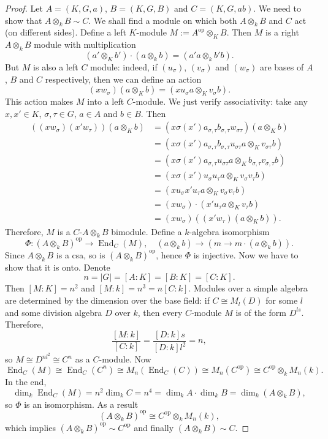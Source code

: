 \documentclass[10pt, a4paper]{article}
\newenvironment{noticeC}{%
  \tcolorbox[%
  notitle,
  empty,
  enhanced,  %
  breakable,
  coltext=black, 
  fontupper=\rmfamily,
  noparskip,
  sharp corners,
  boxrule=-1pt,  %
  frame hidden,
  left=7pt,  %
  right=7pt,
  top=5pt,
  bottom=5pt,
  before skip=2.5ex plus 2pt,
  after skip=2.5ex plus 2pt,
  overlay unbroken and last={%
  },
  ]}
{\endtcolorbox}
\newenvironment{myproof}%
  {\begin{noticeC}\begin{proof}}%
  {\end{proof}\end{noticeC}}
\DeclareMathOperator{\op}{op}
\DeclareMathOperator{\en}{End}
\begin{document}
\begin{myproof}
  Let $A = (K, G, a)$, $B = (K, G, B)$ and $C = (K, G, ab)$.
  We need to show that $A \otimes_k B \sim C$.
  We shall find a module on which both $A \otimes_k B$ and $C$ act (on different sides).
  Define a left $K$-module $M := A^{\op} \otimes_K B$. Then $M$ is a right $A \otimes_k B$ module with multiplication 
  $$(a' \otimes_K b') \cdot (a \otimes_k b) = (a' a \otimes_k b' b).$$
  But $M$ is also a left $C$ module: indeed, if $(u_\sigma)$, $(v_\sigma)$ and $(w_\sigma)$ are bases of $A$, $B$ and $C$ respectively,
  then we can define an action 
  $$(x w_\sigma) (a \otimes_K b) = (x u_{\sigma} a \otimes_K v_\sigma b).$$
  This action makes $M$ into a left $C$-module. We just verify associativity: 
  take any $x, x' \in K$, $\sigma, \tau \in G$, $a \in A$ and $b \in B$.
  Then 
  \begin{align*}
    ((x w_{\sigma}) (x' w_{\tau})) (a \otimes_K b) &= (x \sigma(x') a_{\sigma, \tau} b_{\sigma, \tau} w_{\sigma \tau}) (a \otimes_K b)\\
    &= (x \sigma(x') a_{\sigma, \tau} b_{\sigma, \tau} u_{\sigma \tau} a \otimes_K v_{\sigma \tau} b)\\
    &= (x \sigma(x') a_{\sigma, \tau} u_{\sigma \tau} a \otimes_K b_{\sigma, \tau} v_{\sigma, \tau} b)\\
    &= (x \sigma(x') u_{\sigma} u_{\tau} a \otimes_K v_{\sigma} v_{\tau} b)\\
    &= (x u_{\sigma} x' u_{\tau} a \otimes_K v_{\sigma} v_{\tau} b)\\
    &= (x w_{\sigma}) \cdot (x' u_{\tau} a \otimes_K v_{\tau} b)\\
    &= (x w_{\sigma}) ((x' w_{\tau}) (a \otimes_K b)).
  \end{align*}
  Therefore, $M$ is a $C$-$A \otimes_k B$ bimodule. Define a $k$-algebra isomorphism 
  $$\Phi: (A \otimes_k B)^{\op} \to \en_C (M),\quad (a \otimes_k b) \to (m \to m \cdot (a \otimes_k b)).$$
  Since $A \otimes_k B$ is a csa, so is $(A \otimes_k B)^{\op}$, hence $\Phi$ is injective. Now we have to show that it is onto.
  Denote $$n = |G| = [A:K] = [B:K] = [C:K].$$
  Then $[M : K] = n^2$ and $[M : k] = n^3 = n [C : k]$.
  Modules over a simple algebra are determined by the dimension over the base field: if $C \cong M_l (D)$
  for some $l$ and some division algebra $D$ over $k$, then every $C$-module $M$ is of the form $D^{ls}$.
  Therefore, 
  $$\frac{[M : k]}{[C: k]} = \frac{[D: k] s}{[D : k]l^2} = n,$$
  so $M \cong D^{n l^2} \cong C^n$ as a $C$-module.
  Now $$\en_C (M) \cong \en_C (C^n) \cong M_n (\en_C (C)) \cong M_n (C^{\op}) \cong C^{\op} \otimes_k M_n (k).$$
  In the end,
  $$\dim_k \en_C (M) = n^2 \dim_k C = n^4 = \dim_k A \cdot \dim_k B = \dim_k (A \otimes_k B),$$
  so $\Phi$ is an isomorphism. As a result $$(A \otimes_k B)^{\op} \cong C^{\op} \otimes_k M_n (k),$$
  which implies $(A \otimes_k B)^{\op} \sim C^{\op}$ and finally $(A \otimes_k B) \sim C$.
\end{myproof}
\end{document}
